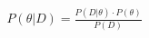 \documentclass[preview]{standalone}
\begin{document}
\begin{align*}
P(\theta|D) = \frac{P(D|\theta) \cdot P(\theta)} {P(D)}
\end{align*}
\end{document}

